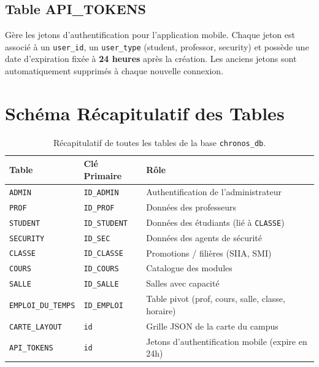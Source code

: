 \documentclass[12pt, a4paper]{report}
\begin{document}
\subsection{Table API\_TOKENS}
Gère les jetons d'authentification pour l'application mobile. Chaque jeton est associé à un \texttt{user\_id}, un \texttt{user\_type} (student, professor, security) et possède une date d'expiration fixée à \textbf{24 heures} après la création. Les anciens jetons sont automatiquement supprimés à chaque nouvelle connexion.

\section{Schéma Récapitulatif des Tables}

\begin{table}[H]
\centering
\renewcommand{\arraystretch}{1.3}
\begin{tabularx}{\textwidth}{l l X}
\toprule
\textbf{Table} & \textbf{Clé Primaire} & \textbf{Rôle} \\
\midrule
\texttt{ADMIN} & \texttt{ID\_ADMIN} & Authentification de l'administrateur \\
\texttt{PROF} & \texttt{ID\_PROF} & Données des professeurs \\
\texttt{STUDENT} & \texttt{ID\_STUDENT} & Données des étudiants (lié à \texttt{CLASSE}) \\
\texttt{SECURITY} & \texttt{ID\_SEC} & Données des agents de sécurité \\
\texttt{CLASSE} & \texttt{ID\_CLASSE} & Promotions / filières (SIIA, SMI) \\
\texttt{COURS} & \texttt{ID\_COURS} & Catalogue des modules \\
\texttt{SALLE} & \texttt{ID\_SALLE} & Salles avec capacité \\
\texttt{EMPLOI\_DU\_TEMPS} & \texttt{ID\_EMPLOI} & Table pivot (prof, cours, salle, classe, horaire) \\
\texttt{CARTE\_LAYOUT} & \texttt{id} & Grille JSON de la carte du campus \\
\texttt{API\_TOKENS} & \texttt{id} & Jetons d'authentification mobile (expire en 24h) \\
\bottomrule
\end{tabularx}
\caption{Récapitulatif de toutes les tables de la base \texttt{chronos\_db}.}
\end{table}


\end{document}
